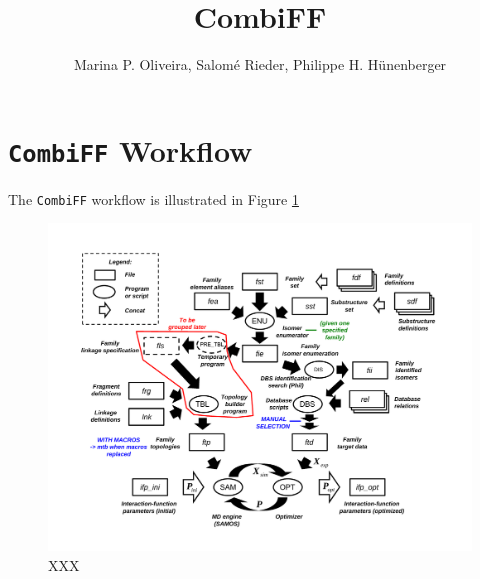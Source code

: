 \documentclass[a4paper,11pt]{article}
\title{CombiFF}
\author{Marina P. Oliveira, Salom\'e Rieder, Philippe H. Hünenberger}
\date{}
\begin{document}
\pagestyle{plain}
\maketitle

\section{\texttt{CombiFF} Workflow}

The \texttt{CombiFF} workflow is illustrated in Figure \ref{cff_workflow}
%
\begin{figure}[h!]
\begin{center}
  \includegraphics[clip=true,scale=0.6]{fig/cff_workflow.pdf}
\end{center}
\caption{XXX}
\label{cff_workflow}
\end{figure}
%
%
\end{document}
